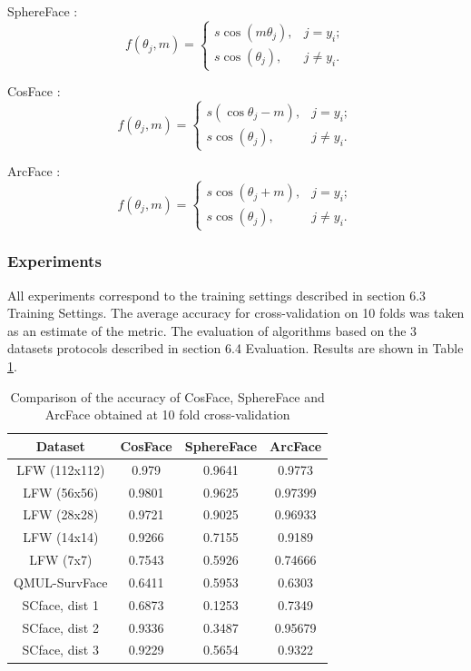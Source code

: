 \documentclass[11pt,a4paper]{article}
\begin{document}
SphereFace \cite{sphereface}: 
\begin{equation*}
f(\theta_j, m) =
\begin{cases}
    s \cos(m\theta_j), & j=y_i;\\
    s \cos(\theta_j), & j \neq y_i.
\end{cases}
\end{equation*}

CosFace \cite{cosface}: 
\begin{equation*}
f(\theta_j, m) =
\begin{cases}
    s (\cos\theta_j - m), & j=y_i;\\
    s \cos(\theta_j), & j \neq y_i.
\end{cases}
\end{equation*}

ArcFace \cite{arcface}: 
\begin{equation*}
f(\theta_j, m) =
\begin{cases}
     s \cos(\theta_j + m), & j=y_i;\\
     s \cos(\theta_j), & j \neq y_i.
\end{cases}
\end{equation*}

\subsubsection{Experiments}
All experiments correspond to the training settings described in section 6.3 Training Settings. The average accuracy for cross-validation on 10 folds was taken as an estimate of the metric.  The evaluation of algorithms based on the 3 datasets protocols described in section 6.4 Evaluation. Results are shown in Table \ref{t1}. 

\begin{table}[ht!]
\begin{center}
\begin{tabular}{||c | c c c||} 
 \hline
 Dataset & CosFace & SphereFace & ArcFace \\ [0.5ex] 
 \hline\hline
 LFW (112x112) & 0.979 & 0.9641 & 0.9773 \\ 
 \hline
  LFW (56x56) & 0.9801 & 0.9625 & 0.97399 \\
 \hline
  LFW (28x28) & 0.9721 & 0.9025 & 0.96933 \\
 \hline
  LFW (14x14) & 0.9266 & 0.7155 & 0.9189 \\
 \hline
  LFW (7x7) & 0.7543 & 0.5926 & 0.74666 \\ 
  \hline
  QMUL-SurvFace & 0.6411 & 0.5953 & 0.6303 \\ 
  \hline
  SCface, dist 1 & 0.6873 & 0.1253 & 0.7349 \\ 
  \hline
  SCface, dist 2 & 0.9336 & 0.3487 & 0.95679 \\ 
  \hline
  SCface, dist 3 & 0.9229 & 0.5654 & 0.9322 \\ [1ex] 
 \hline
\end{tabular}
\caption{Comparison of the accuracy of CosFace, SphereFace and ArcFace obtained at 10 fold cross-validation}
\label{t1}
\end{center}
\end{table}
\end{document}
